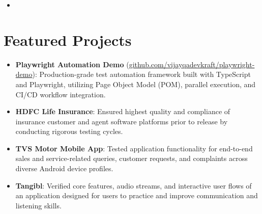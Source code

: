 \documentclass[11pt,a4paper,sans]{moderncv}
\begin{document}
\begin{itemize}
\vspace{3pt}

\item{}

\end{itemize}


\section{Featured Projects}
\vspace{1pt}
\begin{itemize}
\item \textbf{Playwright Automation Demo} (\href{https://github.com/vijayqadevkraft/playwright-demo}{github.com/vijayqadevkraft/playwright-demo}): Production-grade test automation framework built with TypeScript and Playwright, utilizing Page Object Model (POM), parallel execution, and CI/CD workflow integration.
\item \textbf{HDFC Life Insurance}: Ensured highest quality and compliance of insurance customer and agent software platforms prior to release by conducting rigorous testing cycles.
\item \textbf{TVS Motor Mobile App}: Tested application functionality for end-to-end sales and service-related queries, customer requests, and complaints across diverse Android device profiles.
\item \textbf{Tangibl}: Verified core features, audio streams, and interactive user flows of an application designed for users to practice and improve communication and listening skills.
\end{itemize}

\end{document}
